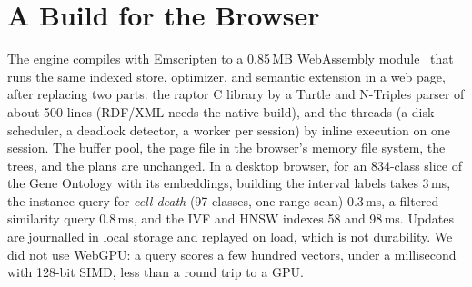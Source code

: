 \section{A Build for the Browser}
\label{sec-system}

The engine compiles with Emscripten to a 0.85\,MB WebAssembly
module~\cite{haas2017} that runs the same indexed store, optimizer, and semantic
extension in a web page, after replacing two parts: the raptor C library by a
Turtle and N-Triples parser of about 500 lines (RDF/XML needs the native build),
and the threads (a disk scheduler, a deadlock detector, a worker per session) by
inline execution on one session.
The buffer pool, the page file in the browser's memory file system, the trees,
and the plans are unchanged.
In a desktop browser, for an 834-class slice of the Gene Ontology with its
embeddings, building the interval labels takes 3\,ms, the instance query for
\emph{cell death} (97 classes, one range scan) 0.3\,ms, a filtered similarity
query 0.8\,ms, and the IVF and HNSW indexes 58 and 98\,ms.
Updates are journalled in local storage and replayed on load, which is not
durability.
We did not use WebGPU: a query scores a few hundred vectors, under a millisecond
with 128-bit SIMD, less than a round trip to a GPU.
